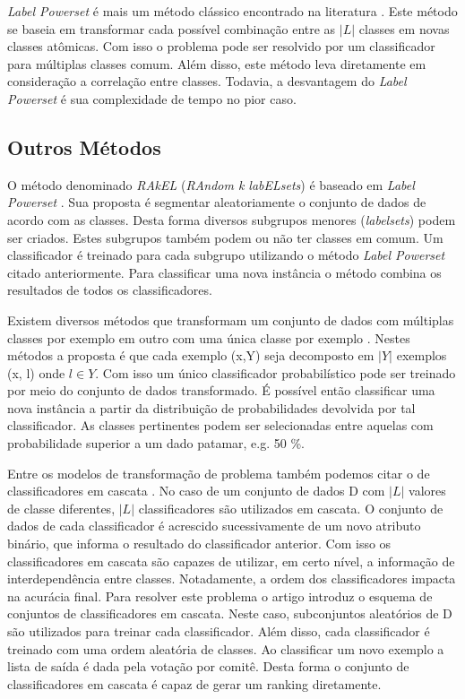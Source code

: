 \textit{Label Powerset} é mais um método clássico encontrado na literatura \cite{Tsoumakas02, Read02}.
Este método se baseia em transformar cada possível combinação entre as $\vert L \vert$ classes em novas classes atômicas.
Com isso o problema pode ser resolvido por um classificador para múltiplas classes comum.
Além disso, este método leva diretamente em consideração a correlação entre classes.
Todavia, a desvantagem do \textit{Label Powerset} é sua complexidade de tempo no pior caso.

\subsection{Outros Métodos}

O método denominado \textit{RAkEL} (\textit{RAndom k labELsets}) é baseado em \textit{Label Powerset} \cite{Tsoumakas03}.
Sua proposta é segmentar aleatoriamente o conjunto de dados de acordo com as classes.
Desta forma diversos subgrupos menores (\textit{labelsets}) podem ser criados.
Estes subgrupos também podem ou não ter classes em comum.
Um classificador é treinado para cada subgrupo utilizando o método \textit{Label Powerset} citado anteriormente.
Para classificar uma nova instância o método combina os resultados de todos os classificadores.

Existem diversos métodos que transformam um conjunto de dados com múltiplas classes por exemplo em outro com uma única classe por exemplo \cite{Boutell, Chen}.
Nestes métodos a proposta é que cada exemplo (x,Y) seja decomposto em $\vert Y \vert$ exemplos (x, l) onde $l \in Y$.
Com isso um único classificador probabilístico pode ser treinado por meio do conjunto de dados transformado.
É possível então classificar uma nova instância a partir da distribuição de probabilidades devolvida por tal classificador.
As classes pertinentes podem ser selecionadas entre aquelas com probabilidade superior a um dado patamar, e.g. 50 \%.

Entre os modelos de transformação de problema também podemos citar o de classificadores em cascata \cite{Read}. 
No caso de um conjunto de dados D com $\vert L \vert$ valores de classe diferentes, $\vert L \vert$ classificadores são utilizados em cascata. 
O conjunto de dados de cada classificador é acrescido sucessivamente de um novo atributo binário, que informa o resultado do classificador anterior. 
Com isso os classificadores em cascata são capazes de utilizar, em certo nível, a informação de interdependência entre classes. 
Notadamente, a ordem dos classificadores impacta na acurácia final.
Para resolver este problema o artigo introduz o esquema de conjuntos de classificadores em cascata. 
Neste caso, subconjuntos aleatórios de D são utilizados para treinar cada classificador. 
Além disso, cada classificador é treinado com uma ordem aleatória de classes. 
Ao classificar um novo exemplo a lista de saída é dada pela votação por comitê. 
Desta forma o conjunto de classificadores em cascata é capaz de gerar um ranking diretamente.


